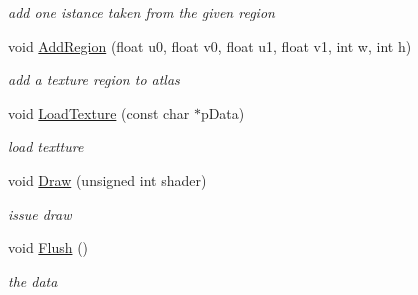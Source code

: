 \begin{DoxyCompactItemize}
\begin{DoxyCompactList}\small\item\em add one istance taken from the given region \end{DoxyCompactList}\item 
\hypertarget{class_texture_atlas_a81b2cb15b666a318de3a89532d8bc69c}{void \hyperlink{class_texture_atlas_a81b2cb15b666a318de3a89532d8bc69c}{Add\-Region} (float u0, float v0, float u1, float v1, int w, int h)}\label{class_texture_atlas_a81b2cb15b666a318de3a89532d8bc69c}

\begin{DoxyCompactList}\small\item\em add a texture region to atlas \end{DoxyCompactList}\item 
\hypertarget{class_texture_atlas_a251b652b2fd3a5902ae1bf83d3697429}{void \hyperlink{class_texture_atlas_a251b652b2fd3a5902ae1bf83d3697429}{Load\-Texture} (const char $\ast$p\-Data)}\label{class_texture_atlas_a251b652b2fd3a5902ae1bf83d3697429}

\begin{DoxyCompactList}\small\item\em load textture \end{DoxyCompactList}\item 
\hypertarget{class_texture_atlas_ad52320227c97485cf77ffa62c167b428}{void \hyperlink{class_texture_atlas_ad52320227c97485cf77ffa62c167b428}{Draw} (unsigned int shader)}\label{class_texture_atlas_ad52320227c97485cf77ffa62c167b428}

\begin{DoxyCompactList}\small\item\em issue draw \end{DoxyCompactList}\item 
\hypertarget{class_texture_atlas_ab864214908340929d817bbe38d96a828}{void \hyperlink{class_texture_atlas_ab864214908340929d817bbe38d96a828}{Flush} ()}\label{class_texture_atlas_ab864214908340929d817bbe38d96a828}

\begin{DoxyCompactList}\small\item\em the data \end{DoxyCompactList}\end{DoxyCompactItemize}
